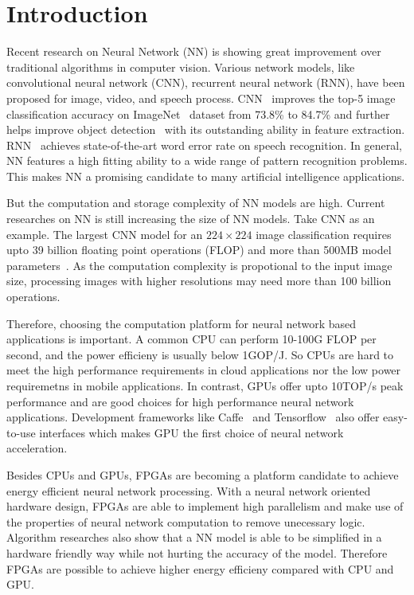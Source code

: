 \section{Introduction}\label{sec:introduction}

Recent research on Neural Network (NN) is showing great improvement over traditional algorithms in computer vision. Various network models, like convolutional neural network (CNN), recurrent neural network (RNN), have been proposed for image, video, and speech process. CNN~\cite{krizhevsky2012imagenet} improves the top-5 image classification accuracy on ImageNet~\cite{ILSVRC15} dataset from 73.8\% to 84.7\% and further helps improve object detection~\cite{girshick2014rich} with its outstanding ability in feature extraction. RNN~\cite{hannun2014deep} achieves state-of-the-art word error rate on speech recognition. In general, NN features a high fitting ability to a wide range of pattern recognition problems. This makes NN a promising candidate to many artificial intelligence applications.

But the computation and storage complexity of NN models are high. Current researches on NN is still increasing the size of NN models. Take CNN as an example. The largest CNN model for an $224\times224$ image classification requires upto 39 billion floating point operations (FLOP) and more than 500MB model parameters~\cite{simonyan2014very}. As the computation complexity is propotional to the input image size, processing images with higher resolutions may need more than 100 billion operations.

Therefore, choosing the computation platform for neural network based applications is important. A common CPU can perform 10-100G FLOP per second, and the power efficieny is usually below 1GOP/J. So CPUs are hard to meet the high performance requirements in cloud applications nor the low power requiremetns in mobile applications. In contrast, GPUs offer upto 10TOP/s peak performance and are good choices for high performance neural network applications. Development frameworks like Caffe~\cite{jia2014caffe} and Tensorflow~\cite{abadi2016tensorflow} also offer easy-to-use interfaces which makes GPU the first choice of neural network acceleration. 

Besides CPUs and GPUs, FPGAs are becoming a platform candidate to achieve energy efficient neural network processing. With a neural network oriented hardware design, FPGAs are able to implement high parallelism and make use of the properties of neural network computation to remove unecessary logic. Algorithm researches also show that a NN model is able to be simplified in a hardware friendly way while not hurting the accuracy of the model. Therefore FPGAs are possible to achieve higher energy efficieny compared with CPU and GPU. 

